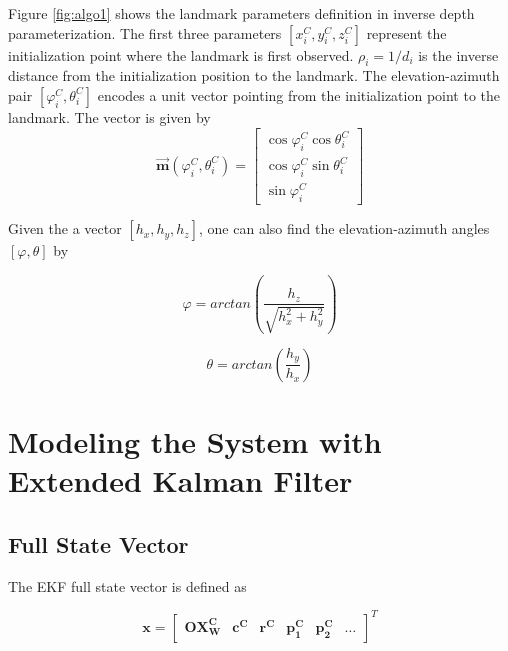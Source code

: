Figure \ref{fig:algo1} shows the landmark parameters definition in
inverse depth parameterization. The first three parameters
$[x_{i}^{C}, y_{i}^{C}, z_{i}^{C}]$ represent the initialization point
where the landmark is first observed. $\rho_{i} = 1/d_i$ is the
inverse distance from the initialization position to the landmark. The
elevation-azimuth pair $[\varphi_{i}^{C}, \theta_{i}^{C}]$ encodes a
unit vector pointing from the initialization point to the landmark.
The vector is given by
\begin{equation}
\label{eq:m}
\vec{\boldsymbol{m}}(\varphi_{i}^{C}, \theta_{i}^{C})=\begin{bmatrix}
\cos\varphi_{i}^{C}\cos\theta _{i}^{C} \\
\cos\varphi_{i}^{C}\sin\theta _{i}^{C} \\
\sin\varphi_{i}^{C}
\end{bmatrix}
\end{equation}

\noindent Given the a vector $[h_x, h_y, h_z]$, one can also find the
elevation-azimuth angles $[\varphi, \theta]$ by

\begin{equation}
\label{eq:m_inv_varphi}
\varphi 
=arctan\left(\frac{h_{z}}{\sqrt{h_x^2+h_y^2}}\right)
\end{equation}

\begin{equation}
\label{eq:m_inv_theta}
\theta =arctan\left(\frac{h_{y}}{h_{x}}\right)
\end{equation}


\section{Modeling the System with Extended Kalman 
Filter}

\subsection{Full State Vector}

The EKF full state vector is defined as 

\begin{equation}
\boldsymbol{x}=\begin{bmatrix}
\boldsymbol{OX_{W}^{C}} & \boldsymbol{c^{C}} & \boldsymbol{r^{C}} & 
\boldsymbol{p_{1}^{C}} & \boldsymbol{p_{2}^{C}} & \ldots 
\end{bmatrix}^T
\end{equation}

